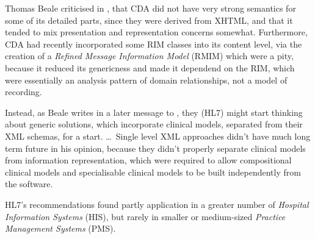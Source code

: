 Thomas Beale criticised in \cite{openhealth}, that CDA did not have very strong
semantics for some of its detailed parts, since they were derived from XHTML,
and that it tended to mix presentation and representation concerns somewhat.
Furthermore, CDA had recently incorporated some RIM classes into its content
level, via the creation of a \emph{Refined Message Information Model} (RMIM)
which were a pity, because it reduced its genericness and made it dependend on
the RIM, which were essentially an analysis pattern of domain relationships,
not a model of recording.

Instead, as Beale writes in a later message to \cite{openhealth}, they (HL7)
might start thinking about generic solutions, which incorporate clinical
models, separated from their XML schemas, for a start. \ldots\ Single level XML
approaches didn't have much long term future in his opinion, because they
didn't properly separate clinical models from information representation, which
were required to allow compositional clinical models and specialisable clinical
models to be built independently from the software.

HL7's recommendations found partly application in a greater number of
\emph{Hospital Information Systems} (HIS), but rarely in smaller or
medium-sized \emph{Practice Management Systems} (PMS).

